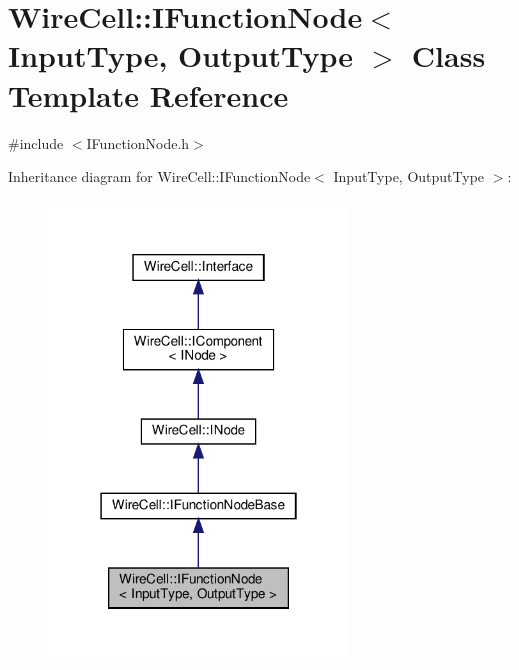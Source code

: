 \hypertarget{class_wire_cell_1_1_i_function_node}{}\section{Wire\+Cell\+:\+:I\+Function\+Node$<$ Input\+Type, Output\+Type $>$ Class Template Reference}
\label{class_wire_cell_1_1_i_function_node}


{\ttfamily \#include $<$I\+Function\+Node.\+h$>$}



Inheritance diagram for Wire\+Cell\+:\+:I\+Function\+Node$<$ Input\+Type, Output\+Type $>$\+:
\nopagebreak
\begin{figure}[H]
\begin{center}
\leavevmode
\includegraphics[width=226pt]{class_wire_cell_1_1_i_function_node__inherit__graph}
\end{center}
\end{figure}


